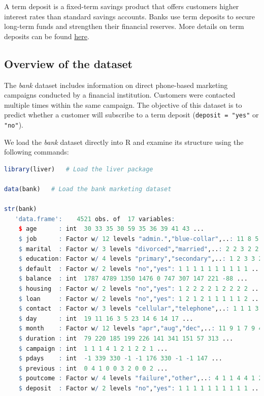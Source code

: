 \documentclass[
  11pt,
]{book}
\newcommand{\passthrough}[1]{#1}
\theoremstyle{definition}
\theoremstyle{definition}
\theoremstyle{definition}
\theoremstyle{definition}
\theoremstyle{remark}
\begin{document}
A term deposit is a fixed-term savings product that offers customers higher interest rates than standard savings accounts. Banks use term deposits to secure long-term funds and strengthen their financial reserves. More details on term deposits can be found \href{https://www.investopedia.com/terms/t/termdeposit.asp}{here}.

\subsection*{Overview of the dataset}\label{overview-of-the-dataset-2}


The \emph{bank} dataset includes information on direct phone-based marketing campaigns conducted by a financial institution. Customers were contacted multiple times within the same campaign. The objective of this dataset is to predict whether a customer will subscribe to a term deposit (\passthrough{\lstinline!deposit = "yes"!} or \passthrough{\lstinline!"no"!}).

We load the \emph{bank} dataset directly into R and examine its structure using the following commands:

\begin{lstlisting}[language=R]
library(liver)   # Load the liver package

data(bank)   # Load the bank marketing dataset 

str(bank)
   'data.frame':    4521 obs. of  17 variables:
    $ age      : int  30 33 35 30 59 35 36 39 41 43 ...
    $ job      : Factor w/ 12 levels "admin.","blue-collar",..: 11 8 5 5 2 5 7 10 3 8 ...
    $ marital  : Factor w/ 3 levels "divorced","married",..: 2 2 3 2 2 3 2 2 2 2 ...
    $ education: Factor w/ 4 levels "primary","secondary",..: 1 2 3 3 2 3 3 2 3 1 ...
    $ default  : Factor w/ 2 levels "no","yes": 1 1 1 1 1 1 1 1 1 1 ...
    $ balance  : int  1787 4789 1350 1476 0 747 307 147 221 -88 ...
    $ housing  : Factor w/ 2 levels "no","yes": 1 2 2 2 2 1 2 2 2 2 ...
    $ loan     : Factor w/ 2 levels "no","yes": 1 2 1 2 1 1 1 1 1 2 ...
    $ contact  : Factor w/ 3 levels "cellular","telephone",..: 1 1 1 3 3 1 1 1 3 1 ...
    $ day      : int  19 11 16 3 5 23 14 6 14 17 ...
    $ month    : Factor w/ 12 levels "apr","aug","dec",..: 11 9 1 7 9 4 9 9 9 1 ...
    $ duration : int  79 220 185 199 226 141 341 151 57 313 ...
    $ campaign : int  1 1 1 4 1 2 1 2 2 1 ...
    $ pdays    : int  -1 339 330 -1 -1 176 330 -1 -1 147 ...
    $ previous : int  0 4 1 0 0 3 2 0 0 2 ...
    $ poutcome : Factor w/ 4 levels "failure","other",..: 4 1 1 4 4 1 2 4 4 1 ...
    $ deposit  : Factor w/ 2 levels "no","yes": 1 1 1 1 1 1 1 1 1 1 ...
\end{lstlisting}
\end{document}
